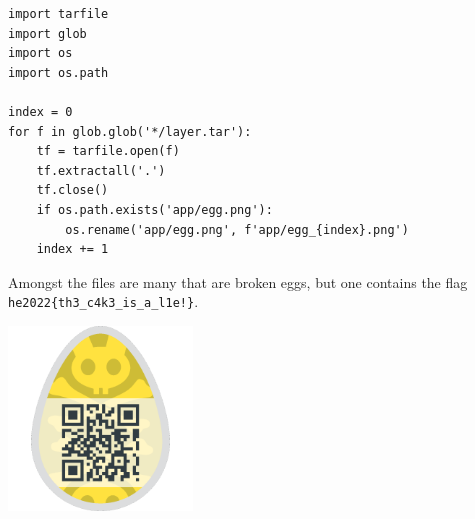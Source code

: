 \begin{verbatim}
import tarfile
import glob
import os
import os.path

index = 0
for f in glob.glob('*/layer.tar'):
    tf = tarfile.open(f)
    tf.extractall('.')
    tf.close()
    if os.path.exists('app/egg.png'):
        os.rename('app/egg.png', f'app/egg_{index}.png')
    index += 1
\end{verbatim}

Amongst the files are many that are broken eggs, but one contains the flag \verb+he2022{th3_c4k3_is_a_l1e!}+.

\begin{marginfigure}
	\includegraphics[width=49mm]{level7/egg_12.png}
\end{marginfigure}




	









